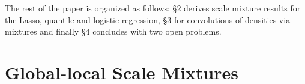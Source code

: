 \documentclass[lineno]{biometrika}
\begin{document}
%
%

The rest of the paper is organized as follows: \S 2 derives scale mixture
results for the Lasso, quantile and logistic regression, \S 3 for convolutions
of densities via mixtures and finally \S 4 concludes with two open problems. 

\section{Global-local Scale Mixtures}
\end{document}
